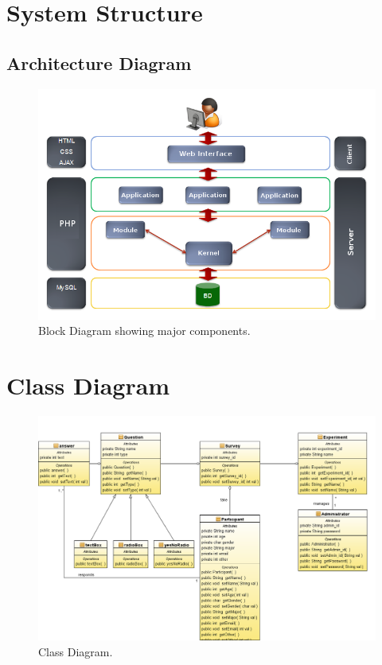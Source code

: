 \documentclass[a4paper,12pt,oneside]{report}
\begin{document}
\section{ System Structure}
\subsection{ Architecture Diagram}
\begin{figure}[h!]
  \begin{center}
   \includegraphics[width=13.5cm]{pics/ar.png}
  \end{center}
\caption{Block Diagram showing major components.}
\end{figure}

\section{Class Diagram}
\begin{figure}[h!]
  \begin{center}
   \includegraphics[width=18cm, angle=90]{pics/class.png}
  \end{center}
\caption{Class Diagram.}
\end{figure}
\end{document}

